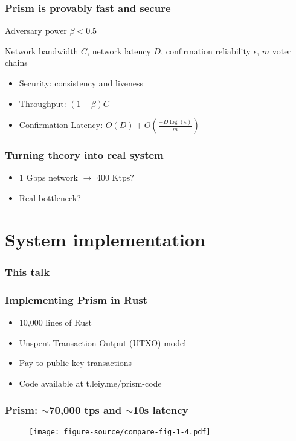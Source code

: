 \documentclass[aspectratio=169]{beamer}
\begin{document}
\begin{frame}
    \frametitle{Prism is provably fast and secure}
    Adversary power $\beta < 0.5$

    Network bandwidth $C$, network latency $D$, confirmation reliability $\epsilon$, $m$ voter chains

    \begin{itemize}
        \item \alert{Security}: consistency and liveness
            \pause
        \item \alert{Throughput}: $(1-\beta)C$
            \pause
        \item \alert{Confirmation Latency}: $O\left(D\right) + O\left(\frac{-D\log\left(\epsilon\right)}{m}\right)$
    \end{itemize}
\end{frame}

\begin{frame}
    \frametitle{Turning theory into real system}
    \begin{itemize}
            \pause
        \item 1 Gbps network $\rightarrow$ 400 Ktps?
            \pause
        \item Real bottleneck?
    \end{itemize}
\end{frame}

\section{System implementation}

\begin{frame}
    \frametitle{This talk}
\end{frame}

\begin{frame}
    \frametitle{Implementing Prism in Rust}
    \begin{itemize}
        \item 10,000 lines of Rust
        \item Unspent Transaction Output (UTXO) model
        \item Pay-to-public-key transactions
        \item Code available at t.leiy.me/prism-code
    \end{itemize}
\end{frame}

\begin{frame}
    \frametitle{Prism: $\sim$70,000 tps and $\sim$10s latency}
    \begin{figure}
        \centering
        \texttt{[image: figure-source/compare-fig-1-4.pdf]}
    \end{figure}
\end{frame}
\end{document}
